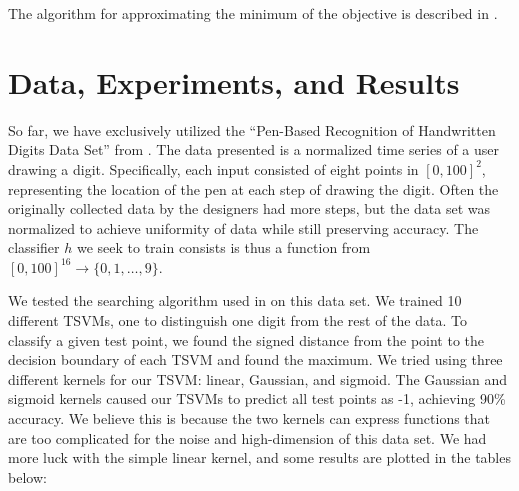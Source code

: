 \documentclass[11pt]{article}
\begin{document}
The algorithm for approximating the minimum of the objective is described
in \cite{joachims2003transductive}.

\section{Data, Experiments, and Results}

So far, we have exclusively utilized the ``Pen-Based Recognition of Handwritten Digits Data Set'' from \cite{Alpaydin:1998}. The data presented is a normalized time series of a user drawing a digit. Specifically, each input consisted of eight points in $[0, 100]^2$, representing the location of the pen at each step of drawing the digit. Often the originally collected data by the designers had more steps, but the data set was normalized to achieve uniformity of data while still preserving accuracy. The classifier $h$ we seek to train consists is thus a function from $[0, 100]^{16} \to \{0, 1, \hdots, 9\}$. 

We tested the searching algorithm used in \cite{Joachims:1999} on this data set. We trained 10 different TSVMs, one to distinguish one digit from the rest of the data. To classify a given test point, we found the signed distance from the point to the decision boundary of each TSVM and found the maximum. We tried using three different kernels for our TSVM: linear, Gaussian, and sigmoid. The Gaussian and sigmoid kernels caused our TSVMs to predict all test points as -1, achieving 90\% accuracy. We believe this is because the two kernels can express functions that are too complicated for the noise and high-dimension of this data set. We had more luck with the simple linear kernel, and some results are plotted in the tables below:\par
\end{document}
